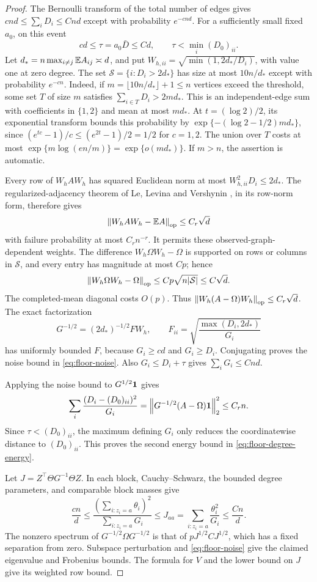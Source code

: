 \begin{proof}
The Bernoulli transform of the total number of edges gives
$cnd\le\sum_iD_i\le Cnd$ except with probability $e^{-cnd}$.
For a sufficiently small fixed $a_0$, on this event
\[
 cd\le\tau=a_0\bar D\le Cd,
 \qquad \tau<\min_i(D_0)_{ii}.
\]
Let $d_* = n\max_{i\ne j}\mathbb E A_{ij}\asymp d$, and put
$W_{h,ii}=\sqrt{\min(1,2d_*/D_i)}$, with value one at zero degree.
The set $\mathcal S=\{i:D_i>2d_*\}$ has size at most $10n/d_*$
except with probability $e^{-cn}$. Indeed, if
$m=\lfloor10n/d_*\rfloor+1\le n$ vertices exceed the threshold,
some set $T$ of size $m$ satisfies $\sum_{i\in T}D_i>2md_*$.
This is an independent-edge sum with coefficients in $\{1,2\}$
and mean at most $md_*$. At $t=(\log2)/2$, its exponential
transform bounds this probability by
$\exp\{-(\log2-1/2)md_*\}$, since
$(e^{tc}-1)/c\le(e^{2t}-1)/2=1/2$ for $c=1,2$.
The union over $T$ costs at most
$\exp\{m\log(en/m)\}=\exp\{o(md_*)\}$.
If $m>n$, the assertion is automatic.

Every row of $W_hAW_h$ has squared Euclidean norm at most
$W_{h,ii}^2D_i\le2d_*$. The regularized-adjacency theorem of
Le, Levina and Vershynin
\cite[Theorem 2.1 and Remark 2.2]{llv2017}, in its row-norm form,
therefore gives
\[
 \left\lVert W_hAW_h-\mathbb E A\right\rVert_{\mathrm{op}}\le C_r\sqrt d
\]
with failure probability at most $C_rn^{-r}$. It permits these
observed-graph-dependent weights. The difference
$W_h\Omega W_h-\Omega$ is supported on rows or columns in
$\mathcal S$, and every entry has magnitude at most $Cp$; hence
\[
 \left\lVert W_h\Omega W_h-\Omega\right\rVert_{\mathrm{op}}
 \le Cp\sqrt{n|\mathcal S|}\le C\sqrt d.
\]
The completed-mean diagonal costs $O(p)$. Thus
$\left\lVert W_h(A-\Omega)W_h\right\rVert_{\mathrm{op}}\le C_r\sqrt d$.
The exact factorization
\[
 G^{-1/2}=(2d_*)^{-1/2}FW_h,
 \qquad F_{ii}=\sqrt{\frac{\max(D_i,2d_*)}{G_i}}
\]
has uniformly bounded $F$, because $G_i\ge cd$ and $G_i\ge D_i$.
Conjugating proves the noise bound in \eqref{eq:floor-noise}.
Also $G_i\le D_i+\tau$ gives $\sum_iG_i\le Cnd$.

Applying the noise bound to $G^{1/2}\mathbf 1$ gives
\[
 \sum_i\frac{(D_i-(D_0)_{ii})^2}{G_i}
 =\left\lVert G^{-1/2}(A-\Omega)\mathbf 1\right\rVert_2^2\le C_rn.
\]
Since $\tau<(D_0)_{ii}$, the maximum defining $G_i$ only reduces
the coordinatewise distance to $(D_0)_{ii}$. This proves the
second energy bound in \eqref{eq:floor-degree-energy}.

Let $J=Z^\top\Theta G^{-1}\Theta Z$. In each block,
Cauchy--Schwarz, the bounded degree parameters, and comparable
block masses give
\[
 \frac{cn}{d}
 \le\frac{(\sum_{i:z_i=a}\theta_i)^2}
          {\sum_{i:z_i=a}G_i}
 \le J_{aa}=\sum_{i:z_i=a}\frac{\theta_i^2}{G_i}
 \le\frac{Cn}{d}.
\]
The nonzero spectrum of $G^{-1/2}\Omega G^{-1/2}$ is that of
$pJ^{1/2}CJ^{1/2}$, which has a fixed separation from zero.
Subspace perturbation and \eqref{eq:floor-noise} give the claimed
eigenvalue and Frobenius bounds. The formula for $V$ and the lower
bound on $J$ give its weighted row bound.


\end{proof}

